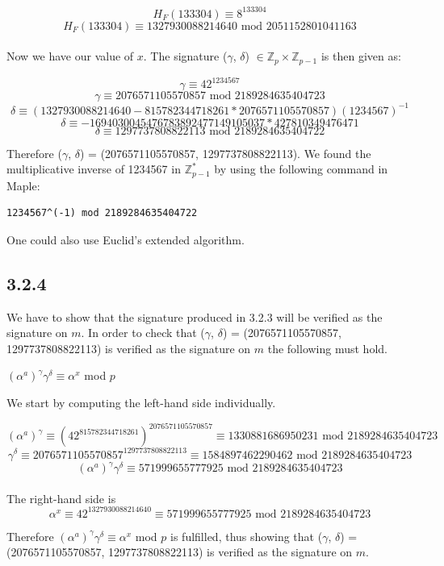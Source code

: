\documentclass[11pt]{report}
\begin{document}
$$H_F(133304) \equiv 8^{133304}$$
$$H_F(133304) \equiv 1327930088214640 \text{ mod } 2051152801041163$$
\\
Now we have our value of $x$. The signature ($\gamma$, $\delta$) $\in \mathbb{Z}_{p} \times \mathbb{Z}_{p-1}$ is then given as:

$$\gamma \equiv 42^{1234567}$$
$$\gamma \equiv 2076571105570857 \text{ mod } 2189284635404723$$
$$\delta \equiv (1327930088214640 - 815782344718261 * 2076571105570857)(1234567)^{-1}$$
$$\delta \equiv -1694030045476783892477149105037 * 427810349476471$$
$$\delta \equiv 1297737808822113 \text{ mod } 2189284635404722$$

Therefore ($\gamma$, $\delta$) = (2076571105570857, 1297737808822113). We found the multiplicative inverse of 1234567 in $\mathbb{Z}^*_{p-1}$ by using the following command in Maple:
\begin{lstlisting}[style=Maple]
1234567^(-1) mod 2189284635404722
\end{lstlisting}
One could also use Euclid's extended algorithm.

\subsection*{3.2.4}
We have to show that the signature produced in 3.2.3 will be verified as the signature on $m$. In order to check that ($\gamma$, $\delta$) = (2076571105570857, 1297737808822113) is verified as the signature on $m$ the following must hold.
\begin{center}
$(\alpha^a)^\gamma \gamma^\delta \equiv \alpha^x$ mod $p$
\end{center}

We start by computing the left-hand side individually.

$$(\alpha^a)^\gamma \equiv (42^{815782344718261})^{2076571105570857} \equiv 1330881686950231 \text{ mod } 2189284635404723$$
$$\gamma^\delta \equiv 2076571105570857^{1297737808822113} \equiv 1584897462290462 \text{ mod } 2189284635404723$$
$$(\alpha^a)^\gamma \gamma^\delta \equiv 571999655777925 \text{ mod } 2189284635404723$$
\\
The right-hand side is
$$\alpha^x \equiv 42^{1327930088214640} \equiv 571999655777925 \text{ mod } 2189284635404723$$

Therefore $(\alpha^a)^\gamma \gamma^\delta \equiv \alpha^x$ mod $p$ is fulfilled, thus showing that ($\gamma$, $\delta$) = (2076571105570857, 1297737808822113) is verified as the signature on $m$.
\end{document}
